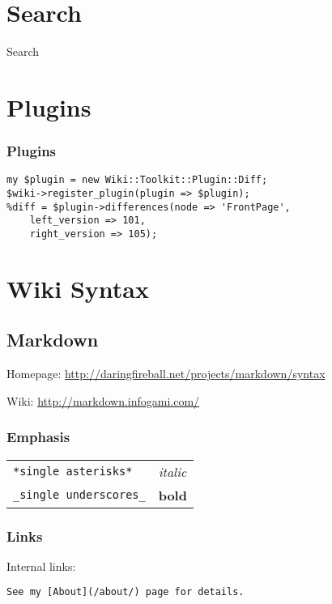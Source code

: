 \section{Search}

\begin{frame}{Search}
\end{frame}

\section{Plugins}

\begin{frame}[fragile]
\frametitle{Plugins}
\begin{lstlisting}
my $plugin = new Wiki::Toolkit::Plugin::Diff;
$wiki->register_plugin(plugin => $plugin);
%diff = $plugin->differences(node => 'FrontPage',
    left_version => 101,
    right_version => 105);
\end{lstlisting}
\end{frame}

\section{Wiki Syntax}
\subsection{Markdown}
Homepage: \url{http://daringfireball.net/projects/markdown/syntax}

Wiki: \url{http://markdown.infogami.com/}

\subsubsection{Emphasis}

\begin{tabular}{ll}
\verb|*single asterisks*| & \textit{italic} \\
\verb|_single underscores_| & \textbf{bold} \\
\end{tabular}


\subsubsection{Links}
Internal links:

\begin{verbatim}
See my [About](/about/) page for details.
\end{verbatim}

